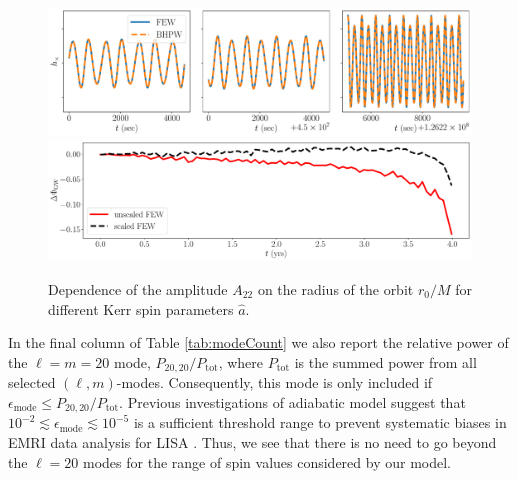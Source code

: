 \documentclass[%
 reprint,
 nofootinbib,
 amsmath,amssymb,
 aps,
 prd,
]{revtex4-2}
\begin{document}
\begin{figure}[!htp]
    \centering
    \includegraphics[width=0.98\linewidth]{figures/few_bhpwave_overlay.pdf}
    \includegraphics[width=0.98\linewidth]{figures/few_phase_comparison.pdf}
    \caption{Dependence of the amplitude $A_{22}$ on the radius of the orbit $r_0/M$ for different Kerr spin parameters $\hat{a}$.}
    \label{fig:amplitudeVariation}
\end{figure}


In the final column of Table \ref{tab:modeCount} we also report the relative power of the $\ell = m = 20$ mode, $P_{20,20}/P_\mathrm{tot}$, where $P_\mathrm{tot}$ is the summed power from all selected $(\ell, m)$-modes. Consequently, this mode is only included if $\epsilon_\mathrm{mode} \leq P_{20,20}/P_\mathrm{tot}$. Previous investigations of adiabatic model suggest that $ 10^{-2} \lesssim \epsilon_\mathrm{mode} \lesssim 10^{-5}$ is a sufficient threshold range to prevent systematic biases in EMRI data analysis for LISA \cite{KatzETC20}. Thus, we see that there is no need to go beyond the $\ell = 20$ modes for the range of spin values considered by our model.
\end{document}
